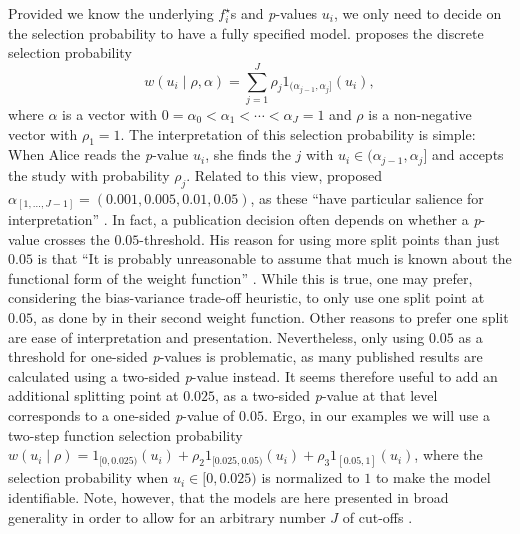 \documentclass[useAMS,usenatbib,referee]{biom}
\begin{document}
Provided we know the underlying $f_{i}^{\star}$s and \textit{p}-values $u_i$, we only need to decide on the selection probability to have a fully specified model. \citet{hedges1992modeling} proposes the discrete selection probability
\begin{equation}
w(u_i\mid\rho,\alpha)=\sum_{j=1}^{J}\rho_{j}1_{(\alpha_{j-1},\alpha_{j}]}(u_i),
\end{equation}
where $\alpha$ is a vector with $0=\alpha_{0}<\alpha_{1}<\cdots<\alpha_{J}=1$ and $\rho$ is a non-negative vector with $\rho_{1}=1$. The interpretation of this selection probability is simple: When Alice reads the \textit{p}-value $u_i$, she finds the $j$ with $u_i\in(\alpha_{j-1},\alpha_{j}]$ and accepts the study with probability $\rho_{j}$. Related to this view, \citet{hedges1992modeling} proposed $\alpha_{[1,\dots,J-1]} = (0.001,0.005,0.01,0.05)$, as these \enquote{have particular salience for interpretation} \citep{hedges1992modeling}. In fact, a publication decision often depends on whether a \textit{p}-value crosses the $0.05$-threshold. His reason for using more split points than just $0.05$ is that \enquote{It is probably unreasonable to assume that much is known about the functional form of the weight function} \citep{hedges1992modeling}. While this is true, one may prefer, considering the bias-variance trade-off heuristic, to only use one split point at $0.05$, as done by \citet{iyengar1988selection} in their second weight function. Other reasons to prefer one split are ease of interpretation and presentation. Nevertheless, only using $0.05$ as a threshold for one-sided \textit{p}-values is problematic, as many published results are calculated using a two-sided \textit{p}-value instead. It seems therefore useful to add an additional splitting point at $0.025$, as a two-sided \textit{p}-value at that level corresponds to a one-sided \textit{p}-value of $0.05$. Ergo, in our examples we will use a two-step function selection probability $w(u_i\mid\rho)=1_{[0,0.025)}(u_i)+\rho_{2}1_{[0.025,0.05)}(u_i)+\rho_{3}1_{\left[0.05,1\right]}(u_i)$, where the selection probability when $u_i\in[0,0.025)$ is normalized to $1$ to make the model identifiable. Note, however, that the models are here presented in broad generality in order to allow for an arbitrary number $J$ of cut-offs \citep[this possibility is already implemented in the R package associated with this paper, \texttt{publipha}, see][for more details]{publipha}.
\end{document}
